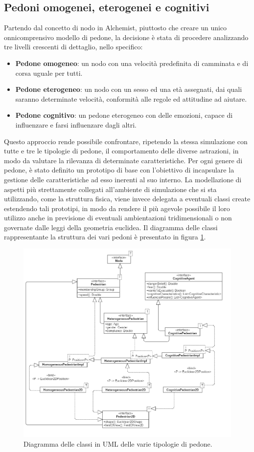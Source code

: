 \subsection{Pedoni omogenei, eterogenei e cognitivi}
Partendo dal concetto di nodo in Alchemist, piuttosto che creare un unico onnicomprensivo modello di pedone, la decisione è stata di procedere analizzando tre livelli crescenti di dettaglio, nello specifico:
\begin{itemize}
    \item \textbf{Pedone omogeneo}: un nodo con una velocità predefinita di camminata e di corsa uguale per tutti.
    \item \textbf{Pedone eterogeneo}: un nodo con un sesso ed una età assegnati, dai quali saranno determinate velocità, conformità alle regole ed attitudine ad aiutare.
    \item \textbf{Pedone cognitivo}: un pedone eterogeneo con delle emozioni, capace di influenzare e farsi influenzare dagli altri.
\end{itemize}
Questo approccio rende possibile confrontare, ripetendo la stessa simulazione con tutte e tre le tipologie di pedone, il comportamento delle diverse astrazioni, in modo da valutare la rilevanza di determinate caratteristiche.
\newline
Per ogni genere di pedone, è stato definito un prototipo di base con l'obiettivo di incapsulare la gestione delle caratteristiche ad esso inerenti al suo interno. La modellazione di aspetti più strettamente collegati all'ambiente di simulazione che si sta utilizzando, come la struttura fisica, viene invece delegata a eventuali classi create estendendo tali prototipi, in modo da rendere il più agevole possibile il loro utilizzo anche in previsione di eventuali ambientazioni tridimensionali o non governate dalle leggi della geometria euclidea. \newline
Il diagramma delle classi rappresentante la struttura dei vari pedoni è presentato in figura \ref{fig:pedestrians-uml}.

\begin{figure}[ht]
  \centering
  \includegraphics[width=0.8\linewidth]{immagini/uml/pedestrians.png}
  \caption{Diagramma delle classi in UML delle varie tipologie di pedone.}
  \label{fig:pedestrians-uml}
\end{figure}

